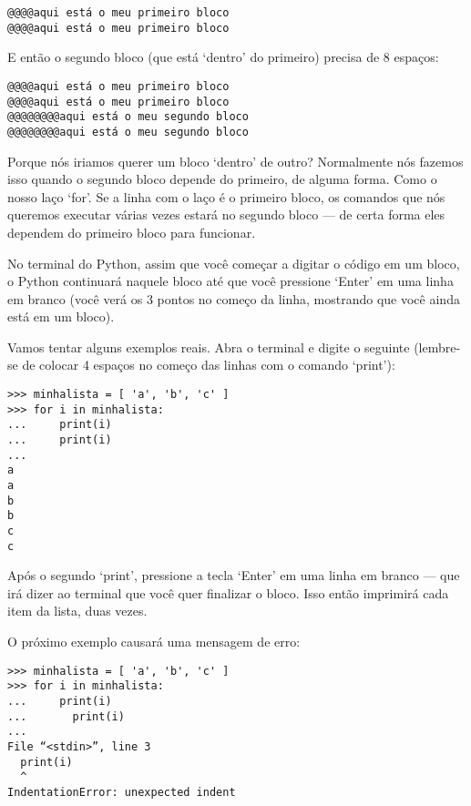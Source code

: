 \begin{listing}
\begin{verbatim}
@@@@aqui está o meu primeiro bloco
@@@@aqui está o meu primeiro bloco
\end{verbatim}
\end{listing}

E então o segundo bloco (que está `dentro' do primeiro) precisa de 8 espaços:

\begin{listing}
\begin{verbatim}
@@@@aqui está o meu primeiro bloco
@@@@aqui está o meu primeiro bloco
@@@@@@@@aqui está o meu segundo bloco
@@@@@@@@aqui está o meu segundo bloco
\end{verbatim}
\end{listing}

Porque nós iriamos querer um bloco `dentro' de outro? Normalmente nós fazemos isso quando o segundo bloco depende do primeiro, de alguma forma. Como o nosso laço `for'. Se a linha com o laço é o primeiro bloco, os comandos que nós queremos executar várias vezes estará no segundo bloco --- de certa forma eles dependem do primeiro bloco para funcionar.

No terminal do Python, assim que você começar a digitar o código em um bloco, o Python continuará naquele bloco até que você pressione `Enter' em uma linha em branco (você verá os 3 pontos no começo da linha, mostrando que você ainda está em um bloco).

Vamos tentar alguns exemplos reais. Abra o terminal e digite o seguinte (lembre-se de colocar 4 espaços no começo das linhas com o comando `print'):

\begin{listing}
\begin{verbatim}
>>> minhalista = [ 'a', 'b', 'c' ]
>>> for i in minhalista:
...     print(i)
...     print(i)
...
a
a
b
b
c
c
\end{verbatim}
\end{listing}

Após o segundo `print', pressione a tecla `Enter' em uma linha em branco --- que irá dizer ao terminal que você quer finalizar o bloco. Isso então imprimirá cada item da lista, duas vezes.
\par
\noindent
O próximo exemplo causará uma mensagem de erro:

\begin{listing}
\begin{verbatim}
>>> minhalista = [ 'a', 'b', 'c' ]
>>> for i in minhalista:
...     print(i)
...       print(i)
...
File “<stdin>”, line 3
  print(i)
  ^
IndentationError: unexpected indent
\end{verbatim}
\end{listing}

